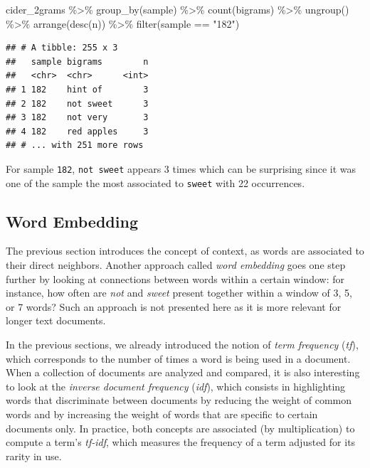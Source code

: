 \documentclass[
]{krantz}
\makeatletter
\newenvironment{Shaded}{\begin{snugshade}}{\end{snugshade}}
\newcommand{\FunctionTok}[1]{\textcolor[rgb]{0,0,0}{#1}}
\newcommand{\NormalTok}[1]{#1}
\newcommand{\SpecialCharTok}[1]{\textcolor[rgb]{0,0,0}{#1}}
\newcommand{\StringTok}[1]{\textcolor[rgb]{0.5,0.5,0.5}{#1}}
\newenvironment{kframe}{%
\medskip{}
\setlength{\fboxsep}{.8em}
 \def\at@end@of@kframe{}%
 \ifinner\ifhmode%
  \def\at@end@of@kframe{\end{minipage}}%
  \begin{minipage}{\columnwidth}%
 \fi\fi%
 \def\FrameCommand##1{\hskip\@totalleftmargin \hskip-\fboxsep
 \colorbox{shadecolor}{##1}\hskip-\fboxsep
     \hskip-\linewidth \hskip-\@totalleftmargin \hskip\columnwidth}%
 \MakeFramed {\advance\hsize-\width
   \@totalleftmargin\z@ \linewidth\hsize
   \@setminipage}}%
 {\par\unskip\endMakeFramed%
 \at@end@of@kframe}
\renewenvironment{Shaded}{\begin{kframe}}{\end{kframe}}
\makeatother
\begin{document}
\begin{Shaded}
\begin{Highlighting}[]
\NormalTok{cider\_2grams }\SpecialCharTok{\%\textgreater{}\%} 
  \FunctionTok{group\_by}\NormalTok{(sample) }\SpecialCharTok{\%\textgreater{}\%} 
  \FunctionTok{count}\NormalTok{(bigrams) }\SpecialCharTok{\%\textgreater{}\%} 
  \FunctionTok{ungroup}\NormalTok{() }\SpecialCharTok{\%\textgreater{}\%} 
  \FunctionTok{arrange}\NormalTok{(}\FunctionTok{desc}\NormalTok{(n)) }\SpecialCharTok{\%\textgreater{}\%} 
  \FunctionTok{filter}\NormalTok{(sample }\SpecialCharTok{==} \StringTok{"182"}\NormalTok{)}
\end{Highlighting}
\end{Shaded}

\begin{verbatim}
## # A tibble: 255 x 3
##   sample bigrams        n
##   <chr>  <chr>      <int>
## 1 182    hint of        3
## 2 182    not sweet      3
## 3 182    not very       3
## 4 182    red apples     3
## # ... with 251 more rows
\end{verbatim}

For sample \texttt{182}, \texttt{not\ sweet} appears 3 times which can be surprising since it was one of the sample the most associated to \texttt{sweet} with 22 occurrences.

\hypertarget{word-embedding}{%
\subsection{Word Embedding}\label{word-embedding}}

The previous section introduces the concept of context, as words are associated to their direct neighbors. Another approach called \emph{word embedding} goes one step further by looking at connections between words within a certain window: for instance, how often are \emph{not} and \emph{sweet} present together within a window of 3, 5, or 7 words? Such an approach is not presented here as it is more relevant for longer text documents.

In the previous sections, we already introduced the notion of \emph{term frequency} (\emph{tf}), which corresponds to the number of times a word is being used in a document. When a collection of documents are analyzed and compared, it is also interesting to look at the \emph{inverse document frequency} (\emph{idf}), which consists in highlighting words that discriminate between documents by reducing the weight of common words and by increasing the weight of words that are specific to certain documents only. In practice, both concepts are associated (by multiplication) to compute a term's \emph{tf-idf}, which measures the frequency of a term adjusted for its rarity in use.
\end{document}
